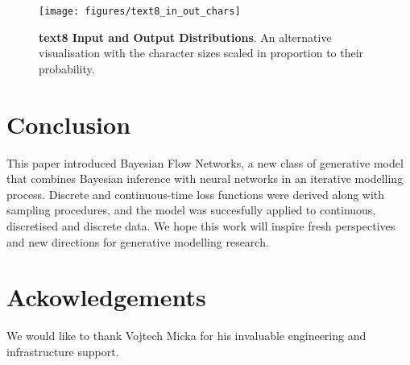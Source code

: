 \documentclass[11pt,table]{article}
\newcommand{\0}[1]{\constvec{0}{#1}}
\newcommand{\1}[1]{\constvec{1}{#1}}
\begin{document}
\begin{figure}[t!]
\centering
\texttt{[image: figures/text8\_in\_out\_chars]}
\caption{\textbf{text8 Input and Output Distributions}. An alternative visualisation with the character sizes scaled in proportion to their probability.}
\end{figure}
\section{Conclusion}\label{sec:conclusion}
This paper introduced Bayesian Flow Networks, a new class of generative model that combines Bayesian inference with neural networks in an iterative modelling process.
Discrete and continuous-time loss functions were derived along with sampling procedures, and the model was succesfully applied to continuous, discretised and discrete data.
We hope this work will inspire fresh perspectives and new directions for generative modelling research.
\section*{Ackowledgements}\label{sec:acknowledgements}
We would like to thank Vojtech Micka for his invaluable engineering and infrastructure support.


\end{document}
